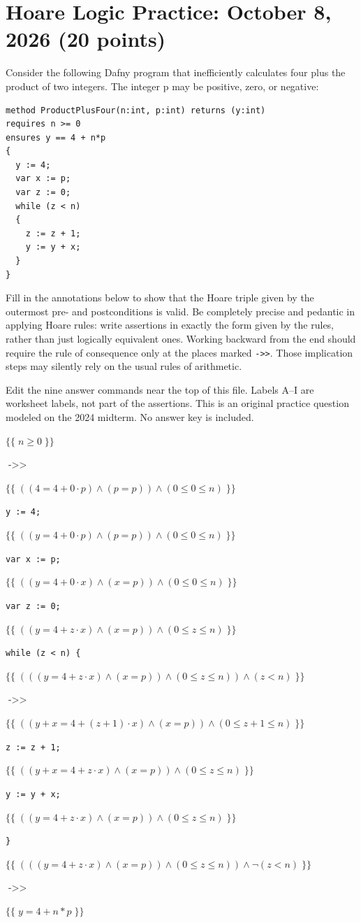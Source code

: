 \documentclass[11pt]{article}
\newcommand{\answerA}{((4 = 4 + 0 \cdot p) \land (p = p)) \land (0 \le 0 \le n)}
\newcommand{\answerB}{((y = 4 + 0 \cdot p) \land (p = p)) \land (0 \le 0 \le n)}
\newcommand{\answerC}{((y = 4 + 0 \cdot x) \land (x = p)) \land (0 \le 0 \le n)}
\newcommand{\answerD}{((y = 4 + z \cdot x) \land (x = p)) \land (0 \le z \le n)}
\newcommand{\answerE}{(((y = 4 + z \cdot x) \land (x = p)) \land (0 \le z \le n)) \land (z < n)}
\newcommand{\answerF}{((y + x = 4 + (z + 1) \cdot x) \land (x = p)) \land (0 \le z + 1 \le n)}
\newcommand{\answerG}{((y + x = 4 + z \cdot x) \land (x = p)) \land (0 \le z \le n)}
\newcommand{\answerH}{((y = 4 + z \cdot x) \land (x = p)) \land (0 \le z \le n)}
\newcommand{\answerI}{(((y = 4 + z \cdot x) \land (x = p)) \land (0 \le z \le n)) \land \neg(z < n)}
\newcommand{\assertion}[2]{%
  \noindent\makebox[1.8em][l]{\textsf{#1}}%
  $\{\!\{\;#2\;\}\!\}$\par\smallskip}
\newcommand{\code}[1]{\noindent\hspace*{1.8em}\texttt{#1}\par\smallskip}
\newcommand{\consequence}{\mathrel{\texttt{->>}}}
\begin{document}
\section*{Hoare Logic Practice: October 8, 2026 (20 points)}
Consider the following Dafny program that inefficiently calculates four
plus the product of two integers. The integer p may be positive, zero, or negative:
\begin{verbatim}
method ProductPlusFour(n:int, p:int) returns (y:int)
requires n >= 0
ensures y == 4 + n*p
{
  y := 4;
  var x := p;
  var z := 0;
  while (z < n)
  {
    z := z + 1;
    y := y + x;
  }
}
\end{verbatim}
Fill in the annotations below to show that the Hoare triple given by the
outermost pre- and postconditions is valid. Be completely precise and
pedantic in applying Hoare rules: write assertions in exactly the form
given by the rules, rather than just logically equivalent ones. Working
backward from the end should require the rule of consequence only at the
places marked \texttt{->>}. Those implication steps may silently rely on
the usual rules of arithmetic.

\medskip
\noindent Edit the nine answer commands near the top of this file.
Labels A--I are worksheet labels, not part of the assertions.
This is an original practice question modeled on the 2024 midterm.
No answer key is included.
\medskip

\assertion{}{n \ge 0}
\noindent\hspace*{1.8em}$\consequence$\par\smallskip
\assertion{A}{\answerA}
\code{y := 4;}
\assertion{B}{\answerB}
\code{var x := p;}
\assertion{C}{\answerC}
\code{var z := 0;}
\assertion{D}{\answerD}
\code{while (z < n) \{}
\assertion{E}{\answerE}
\noindent\hspace*{1.8em}$\consequence$\par\smallskip
\assertion{F}{\answerF}
\code{\quad z := z + 1;}
\assertion{G}{\answerG}
\code{\quad y := y + x;}
\assertion{H}{\answerH}
\code{\}}
\assertion{I}{\answerI}
\noindent\hspace*{1.8em}$\consequence$\par\smallskip
\assertion{}{y = 4 + n * p}
\end{document}
